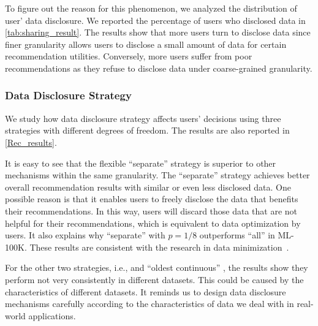 To figure out the reason for this phenomenon, we analyzed the distribution of user' data disclosure.
We reported the percentage of users who disclosed data in \cref{tab:sharing_result}.
The results show that more users turn to disclose data since finer granularity allows users to disclose a small amount of data for certain recommendation utilities.
Conversely, more users suffer from poor recommendations as they refuse to disclose data under coarse-grained granularity.












\subsubsection{Data Disclosure Strategy}

We study how data disclosure strategy affects users' decisions using three strategies with different degrees of freedom. %
The results are also reported in \cref{Rec_results}.


It is easy to see that the flexible ``separate'' strategy is superior to other mechanisms within the same granularity. 
The ``separate'' strategy achieves better overall recommendation results with similar or even less disclosed data. %
One possible reason is that it enables users to freely disclose the data that benefits their recommendations.
In this way, users will discard those data that are not helpful for their recommendations, which is equivalent to data optimization by users.
It also explains why ``separate'' with $p{=}1/8$ outperforms ``all'' in ML-100K.
These results are consistent with the research in data minimization~\cite{chow2013differential,Wen:recsys18:Exploring,biega2020operationalizing}.


For the other two strategies, i.e., and ``oldest continuous'' , the results show they perform not very consistently in different datasets.
This could be caused by the characteristics of different datasets.
It reminds us to design data disclosure mechanisms carefully according to the characteristics of data we deal with in real-world applications.







